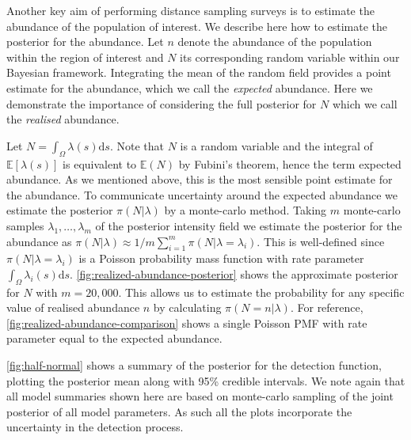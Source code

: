 \documentclass[preprint,12pt]{elsarticle}
\begin{document}
Another key aim of performing distance sampling surveys is to estimate the abundance of the population of interest.  We describe here how to estimate the posterior for the abundance. Let $n$ denote the abundance of the population within the region of interest and $N$ its corresponding random variable within our Bayesian framework.  Integrating the mean of the random field provides a point estimate for the abundance, which we call the \textit{expected} abundance.  Here we demonstrate the importance of considering the full posterior for $N$ which we call the \textit{realised} abundance.

Let $N = \int_{\Omega}\lambda(s)\mathrm{d}s$. Note that $N$ is a random variable and the integral of $\mathbb{E}[\lambda(s)]$ is equivalent to $\mathbb{E}(N)$ by Fubini's theorem, hence the term expected abundance.  As we mentioned above, this is the most sensible point estimate for the abundance.  To communicate uncertainty around the expected abundance we estimate the posterior $\pi(N | \lambda)$ by a monte-carlo method.  Taking $m$ monte-carlo samples  $\lambda_1, \ldots, \lambda_m$ of the posterior intensity field we estimate the posterior for the abundance as $\pi(N | \lambda) \approx 1 / m \sum_{i=1}^m \pi (N | \lambda = \lambda_i)$. This is well-defined since $\pi(N | \lambda = \lambda_i)$ is a Poisson probability mass function with rate parameter $\int_{\Omega}\lambda_i(s)\mathrm{d}s$. \autoref{fig:realized-abundance-posterior} shows the approximate posterior for $N$ with $m = 20,000$.  This allows us to estimate the probability for any specific value of realised abundance $n$ by calculating $\pi(N = n | \lambda)$.  For reference, \autoref{fig:realized-abundance-comparison} shows a single Poisson PMF with rate parameter equal to the expected abundance.

\autoref{fig:half-normal} shows a summary of the posterior for the detection function, plotting the posterior mean along with 95\% credible intervals.  We note again that all model summaries shown here are based on monte-carlo sampling of the joint posterior of all model parameters.  As such all the plots incorporate the uncertainty in the detection process.  
\end{document}
